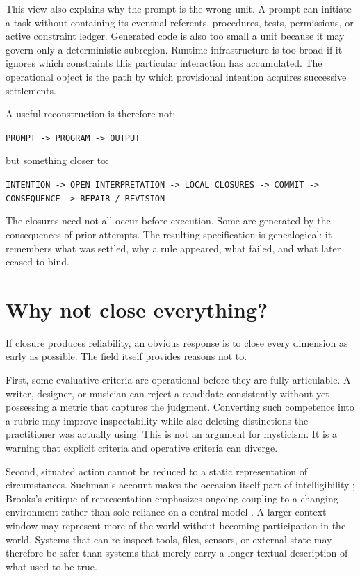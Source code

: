 \documentclass[11pt]{article}
\begin{document}
This view also explains why the prompt is the wrong unit. A prompt can initiate a task without containing its eventual referents, procedures, tests, permissions, or active constraint ledger. Generated code is also too small a unit because it may govern only a deterministic subregion. Runtime infrastructure is too broad if it ignores which constraints this particular interaction has accumulated. The operational object is the path by which provisional intention acquires successive settlements.

A useful reconstruction is therefore not:

\begin{center}
\texttt{PROMPT -> PROGRAM -> OUTPUT}
\end{center}

but something closer to:

\begin{center}
\texttt{INTENTION -> OPEN INTERPRETATION -> LOCAL CLOSURES -> COMMIT -> CONSEQUENCE -> REPAIR / REVISION}
\end{center}

The closures need not all occur before execution. Some are generated by the consequences of prior attempts. The resulting specification is genealogical: it remembers what was settled, why a rule appeared, what failed, and what later ceased to bind.

\section{Why not close everything?}
If closure produces reliability, an obvious response is to close every dimension as early as possible. The field itself provides reasons not to.

First, some evaluative criteria are operational before they are fully articulable. A writer, designer, or musician can reject a candidate consistently without yet possessing a metric that captures the judgment. Converting such competence into a rubric may improve inspectability while also deleting distinctions the practitioner was actually using. This is not an argument for mysticism. It is a warning that explicit criteria and operative criteria can diverge.

Second, situated action cannot be reduced to a static representation of circumstances. Suchman's account makes the occasion itself part of intelligibility \parencite{suchman1985plans}; Brooks's critique of representation emphasizes ongoing coupling to a changing environment rather than sole reliance on a central model \parencite{brooks1991intelligence}. A larger context window may represent more of the world without becoming participation in the world. Systems that can re-inspect tools, files, sensors, or external state may therefore be safer than systems that merely carry a longer textual description of what used to be true.
\end{document}
